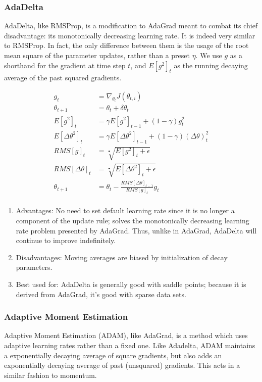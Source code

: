 \documentclass[twoside,11pt]{homework}
\begin{document}
\subsubsection{AdaDelta}
AdaDelta, like RMSProp, is a modification to AdaGrad meant to combat its chief disadvantage: its monotonically decreasing learning  rate. It is indeed very similar to RMSProp. In fact, the only difference between them is the usage of the root mean square of the parameter updates, rather than a preset $\eta$. We use $g$ as a shorthand for the gradient at time step $t$, and $E[g^2]_t$ as the running decaying average of the past squared gradients.

\begin{align*}
	g_t &= \nabla_{\theta_t} J(\theta_{t, i})\\
	\theta_{t+1} &= \theta_t + \delta \theta_t\\
	E[g^2]_t &= \gamma E[g^2]_{t-1} + (1-\gamma)g^2_t \\
	E[\Delta \theta^2]_t &= \gamma E[\Delta \theta^2]_{t-1} + (1-\gamma)(\Delta \theta)^2_t \\
	RMS[g]_t &= \sqrt[•]{E[g^2]_t+\epsilon}\\
	RMS[\Delta \theta]_t &= \sqrt[•]{E[\Delta \theta^2]_t+\epsilon}\\
	\theta_{t+1} &= \theta_t - \frac{RMS[\Delta \theta]_{t-1}}{RMS[g]_t} g_t\\
\end{align*}
\begin{enumerate}
	\item Advantages: No need to set default learning rate since it is no longer a component of the update rule; solves the monotonically decreasing learning rate problem presented by AdaGrad. Thus, unlike in AdaGrad, AdaDelta will continue to improve indefinitely.
	\item Disadvantages: Moving averages are biased by initialization of decay parameters.
	\item Best used for: AdaDelta is generally good with saddle points; because it is derived from AdaGrad, it's good with sparse data sets. 
\end{enumerate}
\subsubsection{Adaptive Moment Estimation}

Adaptive Moment Estimation (ADAM), like AdaGrad, is a method which uses adaptive learning rates rather than a fixed one. Like Adadelta, ADAM maintains a exponentially decaying average of square gradients, but also adds an exponentially decaying average of past (unsquared) gradients. This acts in a similar fashion to momentum.
\end{document}
